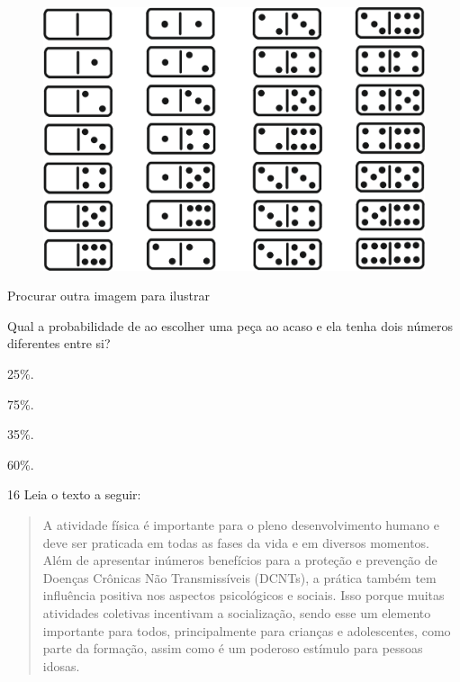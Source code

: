 \begin{figure}[htpb!]
\centering
\includegraphics[width=\textwidth]{./ilustras-mat/Simulado_4-atividade_15.png}
\end{figure}

Procurar outra imagem para ilustrar

Qual a probabilidade de ao escolher uma peça ao acaso e ela tenha dois
números diferentes entre si?

\begin{escolha}

\item
  25\%.
\item
  75\%.
\item
  35\%.
\item
  60\%.
\end{escolha}


\num{16} Leia o texto a seguir:

\begin{quote}
A atividade física é importante para o pleno desenvolvimento humano e
deve ser praticada em todas as fases da vida e em diversos momentos.
Além de apresentar inúmeros benefícios para a proteção e prevenção de
Doenças Crônicas Não Transmissíveis (DCNTs), a prática também tem
influência positiva nos aspectos psicológicos e sociais. Isso porque
muitas atividades coletivas incentivam a socialização, sendo esse um
elemento importante para todos, principalmente para crianças e
adolescentes, como parte da formação, assim como é um poderoso estímulo
para pessoas idosas.

\end{quote}

